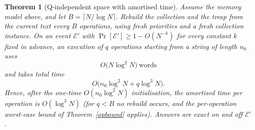 ﻿\documentclass[11pt]{article}
\theoremstyle{plain}
\newtheorem{theorem}{Theorem}
\theoremstyle{remark}
\begin{document}
\begin{theorem}[Q-independent space with amortised time]\label{rebuild}
Assume the memory model above, and let $B=\lceil N/\log N\rceil$. Rebuild the collection and the treap from the current text every $B$ operations, using fresh priorities and a fresh collection instance. On an event $\mathcal E'$ with $\Pr[\mathcal E']\ge1-O(N^{-k})$ for every constant $k$ fixed in advance, an execution of $q$ operations starting from a string of length $n_0$ uses
\[
O\bigl(N\log^2N\bigr)\ \text{words}
\]
and takes total time
\[
O\bigl(n_0\log^2N+q\log^3N\bigr).
\]
Hence, after the one-time $O(n_0\log^2N)$ initialisation, the amortised time per operation is $O(\log^3N)$ (for $q<B$ no rebuild occurs, and the per-operation worst-case bound of Theorem~\ref{opbound} applies). Answers are exact on and off $\mathcal E'$.
\end{theorem}
\end{document}
